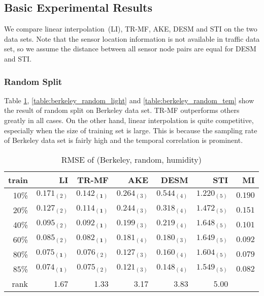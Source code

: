 \subsection{Basic Experimental Results} %
We compare linear interpolation~(LI), TR-MF, AKE, DESM and STI on the two data sets. Note that the sensor location information is not available in traffic data set, so we assume the distance between all sensor node pairs are equal for DESM and STI.

\subsubsection{Random Split}
Table \ref{table:berkeley_random_hum}, \ref{table:berkeley_random_light} and \ref{table:berkeley_random_tem} show the result of random split on Berkeley data set. TR-MF outperforms others greatly in all cases. On the other hand, linear interpolation is quite competitive, especially when the size of training set is large. This is because the sampling rate of Berkeley data set is fairly high and the temporal correlation is prominent. 

\begin{table}[htbp]
\setlength{\tabcolsep}{2pt}
\centering
\caption{RMSE of (Berkeley, random, humidity)}
\label{table:berkeley_random_hum}
\begin{tabular}{ r | r r r r r r}
	train	&LI	&TR-MF	&AKE	&DESM	&STI &MI\\ \hline
	10\% & $ 0.171_{(2)} $ & $ \mathbf{ 0.142_{(1)} } $ & $ 0.264_{(3)} $ & $ 0.544_{(4)} $ & $ 1.220_{(5)} $&$0.190$ \\
	20\% & $ 0.127_{(2)} $ & $ \mathbf{ 0.114_{(1)} } $ & $ 0.244_{(3)} $ & $ 0.318_{(4)} $ & $ 1.472_{(5)} $ &$ 0.151$\\
	40\% & $ 0.095_{(2)} $ & $ \mathbf{ 0.092_{(1)} } $ & $ 0.199_{(3)} $ & $ 0.219_{(4)} $ & $ 1.648_{(5)} $ &$ 0.101$\\
	60\% & $ 0.085_{(2)} $ & $ \mathbf{ 0.082_{(1)} } $ & $ 0.181_{(4)} $ & $ 0.180_{(3)} $ & $ 1.649_{(5)} $ &$ 0.092$\\
	80\% & $ \mathbf{ 0.075_{(1)} } $ & $ 0.076_{(2)} $ & $ 0.127_{(3)} $ & $ 0.160_{(4)} $ & $ 1.604_{(5)} $ &$0.079$ \\
	85\% & $ \mathbf{ 0.074_{(1)} } $ & $ 0.075_{(2)} $ & $ 0.121_{(3)} $ & $ 0.148_{(4)} $ & $ 1.549_{(5)} $ &$0.082$ \\ \hline
	rank &1.67 &1.33 &3.17 &3.83 &5.00 \\
\end{tabular}
\end{table}

